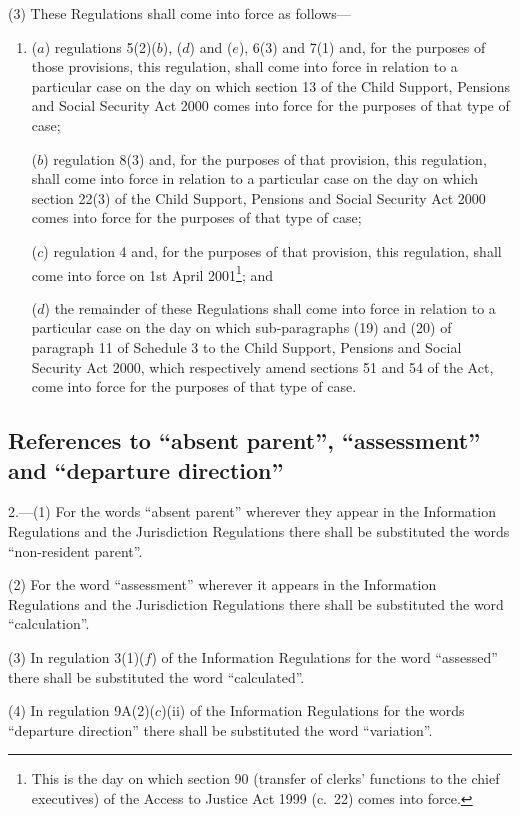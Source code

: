 \documentclass[12pt,a4paper]{article}
\begin{document}
(3) These Regulations shall come into force as follows—
\begin{enumerate}\item[]
($a$) regulations 5(2)($b$), ($d$)  and ($e$), 6(3) and 7(1) and, for the purposes of those provisions, this regulation, shall come into force in relation to a particular case on the day on which section 13 of the Child Support, Pensions and Social Security Act 2000 comes into force for the purposes of that type of case;

($b$) regulation 8(3) and, for the purposes of that provision, this regulation, shall come into force in relation to a particular case on the day on which section 22(3) of the Child Support, Pensions and Social Security Act 2000 comes into force for the purposes of that type of case;

($c$) regulation 4 and, for the purposes of that provision, this regulation, shall come into force on 1st April 2001\footnote{This is the day on which section 90 (transfer of clerks' functions to the chief executives) of the Access to Justice Act 1999 (c.\ 22) comes into force.}; and

($d$) the remainder of these Regulations shall come into force in relation to a particular case on the day on which sub-paragraphs (19) and (20) of paragraph 11 of Schedule 3 to the Child Support, Pensions and Social Security Act 2000, which respectively amend sections 51 and 54 of the Act, come into force for the purposes of that type of case.
\end{enumerate}

\subsection[2. References to “absent parent”, “assessment” and “departure direction”]{References to “absent parent”, “assessment” and “departure direction”}

2.---(1)  For the words “absent parent” wherever they appear in the Information Regulations and the Jurisdiction Regulations there shall be substituted the words “non-resident parent”.

(2) For the word “assessment” wherever it appears in the Information Regulations and the Jurisdiction Regulations there shall be substituted the word “calculation”.

(3) In regulation 3(1)($f$)  of the Information Regulations for the word “assessed” there shall be substituted the word “calculated”.

(4) In regulation 9A(2)($c$)(ii)  of the Information Regulations for the words “departure direction” there shall be substituted the word “variation”.
\end{document}
